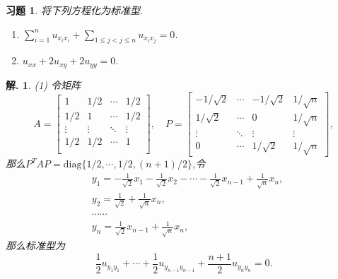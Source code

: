 \documentclass[a4paper,oneside,12pt]{ctexart}
\theoremstyle{plain}
\newtheorem{exercise}{习题}
\theoremstyle{nonumberplain}
\newtheorem{solution}{解.}
\theoremstyle{nonumberplain}
\newcommand{\diag}{\mathrm{diag}}
\begin{document}
    \begin{exercise}
        \label{ex:1.2}
        将下列方程化为标准型.
        \begin{enumerate}
            \item $\sum_{i=1}^nu_{x_ix_i}+\sum_{1\leqslant j<j\leqslant n}u_{x_ix_j}=0$.
            \item $u_{xx}+2u_{xy}+2u_{yy}=0$.
        \end{enumerate}
    \end{exercise}

    \begin{solution}
        (1) 令矩阵 
        \begin{equation*}
            A=\begin{bmatrix}
                1 & 1/2 & \cdots & 1/2\\
                1/2 & 1 & \cdots & 1/2\\
                \vdots & \vdots & \ddots & \vdots\\
                1/2 & 1/2 & \cdots &1 \\
            \end{bmatrix},\quad P=\begin{bmatrix}
                -1/\sqrt{2} & \cdots & -1/\sqrt{2} & 1/\sqrt{n}\\
                1/\sqrt{2} & \cdots & 0 & 1/\sqrt{n}\\
                \vdots & \ddots & \vdots & \vdots \\
                0 &\cdots &1/\sqrt{2} & 1/\sqrt{n}
            \end{bmatrix},
        \end{equation*}
        那么$P^TAP=\diag\{1/2,\cdots,1/2,(n+1)/2\}$,令
        \begin{align*}
            &y_1=-\frac{1}{\sqrt{2}}x_1-\frac{1}{\sqrt{2}}x_2-\cdots-\frac{1}{\sqrt{2}}x_{n-1}+\frac{1}{\sqrt{n}}x_n,\\
            &y_2=\frac{1}{\sqrt{2}}+\frac{1}{\sqrt{n}}x_n,\\
            &\cdots\cdots\\
            &y_n=\frac{1}{\sqrt{2}}x_{n-1}+\frac{1}{\sqrt{n}}x_n,
        \end{align*}
        那么标准型为
        \begin{equation*}
            \frac{1}{2}u_{y_1y_1}+\cdots+\frac{1}{2}u_{y_{n-1}y_{n-1}}+\frac{n+1}{2}u_{y_ny_n}=0.
        \end{equation*}


\end{solution}
\end{document}
